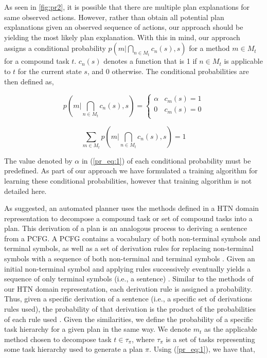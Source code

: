 As seen in  \autoref{fig:pr2}, it is possible that there are multiple plan explanations for same observed actions. However, rather than obtain all potential plan explanations given an observed sequence of actions, our approach should be yielding the most likely plan explanation. With this in mind, our approach assigns a conditional probability $p(m | \bigcap_{n \in M_t} c_n(s), s)$ for a method $m \in M_t$ for a compound task $t$. $c_n(s)$ denotes a function that is 1 if $n \in M_t$ is applicable to $t$ for the current state $s$, and 0 otherwise. The conditional probabilities are then defined as,

\begin{equation} \label{pr_eq:1}
p(m | \bigcap_{n \in M_t} c_n(s), s) = \begin{cases} \alpha  & c_m(s) = 1 \\ 0 & c_m(s) = 0 \\ \end{cases}
\end{equation}

\begin{equation}  \label{pr_eq:2}
\sum_{m \in M_t} p(m | \bigcap_{n \in M_t} c_n(s), s) = 1
\end{equation}

The value denoted by $\alpha$ in (\ref{pr_eq:1}) of each conditional probability must be predefined. As part of our approach we have formulated a training algorithm for learning these conditional probabilities, however that training algorithm is not detailed here. 

As suggested, an automated planner uses the methods defined in a HTN domain representation to decompose a compound task or set of compound tasks into a plan. This derivation of a plan is an analogous process to deriving a sentence from a PCFG. A PCFG contains a vocabulary of both non-terminal symbols and terminal symbols, as well as a set of derivation rules for replacing non-terminal symbols with a sequence of both non-terminal and terminal symbols \citep{Collins_2011}. Given an initial non-terminal symbol and applying rules successively eventually yields a sequence of only terminal symbols (i.e., a sentence) \citep{Collins_2011}. Similar to the methods of our HTN domain representation, each derivation rule is assigned a probability. Thus, given a specific derivation of a sentence (i.e., a specific set of derivations rules used), the probability of that derivation is the product of the probabilities of each rule used \citep{Collins_2011}. Given the similarities, we define the probability of a specific task hierarchy for a given plan in the same way. We denote $m_t$ as the applicable method chosen to decompose task $t \in \tau_\pi$, where $\tau_\pi$ is a set of tasks representing some task hierarchy used to generate a plan $\pi$. Using (\ref{pr_eq:1}), we have that,

